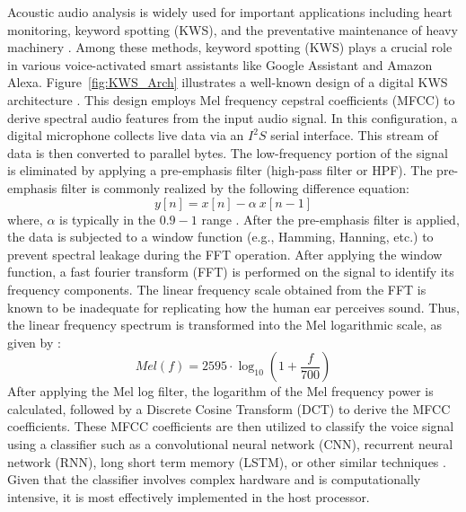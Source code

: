 Acoustic audio analysis is widely used for important applications including heart monitoring, keyword spotting (KWS), and the preventative maintenance of heavy machinery \cite{chong20220}. 
Among these methods, keyword spotting (KWS) plays a crucial role in various voice-activated smart assistants like Google Assistant and Amazon Alexa.
Figure~\ref{fig:KWS_Arch} illustrates a well-known design of a digital KWS architecture \cite{chong20220}. This design employs Mel frequency cepstral coefficients (MFCC) to derive spectral audio features from the input audio signal.
In this configuration, a digital microphone collects live data via an $I^2S$ serial interface. This stream of data is then converted to parallel bytes. The low-frequency portion of the signal is eliminated by applying a pre-emphasis filter (high-pass filter or HPF). The pre-emphasis filter is commonly realized by the following difference equation:
\begin{equation}
    y[n] = x[n] - \alpha~x[n-1] \label{eq:hpf}
\end{equation}
where, $\alpha$ is typically in the $0.9-1$ range \cite{han2006efficient}.  
After the pre-emphasis filter is applied, the data is subjected to a window function (e.g., Hamming, Hanning, etc.) to prevent spectral leakage during the FFT operation.
After applying the window function, a fast fourier transform (FFT) is performed on the signal to identify its frequency components. The linear frequency scale obtained from the FFT is known to be inadequate for replicating how the human ear perceives sound. Thus, the linear frequency spectrum is transformed into the Mel logarithmic scale, as given by \cite{han2006efficient}:
\begin{equation}
    Mel(f) = 2595\cdot \log_{10}\left({1 + \frac{f}{700}}\right) \label{eq:mel-log}
\end{equation}
After applying the Mel log filter, the logarithm of the Mel frequency power is calculated, followed by a Discrete Cosine Transform (DCT) to derive the MFCC coefficients. These MFCC coefficients are then utilized to classify the voice signal using a classifier such as a convolutional neural network (CNN), recurrent neural network (RNN), long short term memory (LSTM), or other similar techniques \cite{mahmood2021speech}. Given that the classifier involves complex hardware and is computationally intensive, it is most effectively implemented in the host processor.

